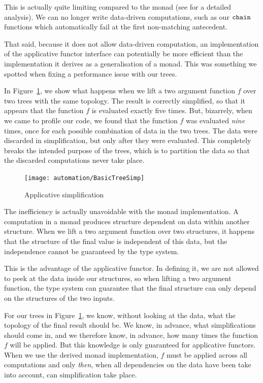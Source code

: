 This is actually quite limiting compared to the monad (see \cite{IdiomsArrowsMonads} for a detailed analysis). We can no longer write data-driven computations, such as our $\texttt{chain}$ functions which automatically fail at the first non-matching antecedent.

That said, because it does not allow data-driven computation, an implementation of the applicative functor interface can potentially be more efficient than the implementation it derives as a generalisation of a monad. This was something we spotted when fixing a performance issue with our trees.

In Figure~\ref{fig:ApplicativeSimp}, we show what happens when we lift a two argument function $f$ over two trees with the same topology. The result is correctly simplified, so that it appears that the function $f$ is evaluated exactly five times. But, bizarrely, when we came to profile our code, we found that the function $f$ was evaluated \emph{nine} times, once for each possible combination of data in the two trees. The data were discarded in simplification, but only after they were evaluated. This completely breaks the intended purpose of the trees, which is to partition the data so that the discarded computations never take place.

\begin{figure}
\centering\texttt{[image: automation/BasicTreeSimp]}
\caption{Applicative simplification}
\label{fig:ApplicativeSimp}
\end{figure}

The inefficiency is actually unavoidable with the monad implementation. A computation in a monad produces structure dependent on data within another structure. When we lift a two argument function over two structures, it happens that the structure of the final value is independent of this data, but the independence cannot be guaranteed by the type system.

This is the advantage of the applicative functor. In defining it, we are not allowed to peek at the data inside our structures, so when lifting a two argument function, the type system can guarantee that the final structure can only depend on the structures of the two inputs. 

For our trees in Figure~\ref{fig:ApplicativeSimp}, we know, without looking at the data, what the topology of the final result should be. We know, in advance, what simplifications should come in, and we therefore know, in advance, how many times the function $f$ will be applied. But this knowledge is only guaranteed for applicative functors. When we use the derived monad implementation, $f$ must be applied across all computations and only \emph{then}, when all dependencies on the data have been take into account,  can simplification take place.

